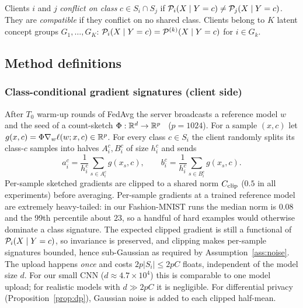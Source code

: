 \begin{definition}\label{def:concept}
Clients $i$ and $j$ \emph{conflict on class} $c\in S_i\cap S_j$ if $\mathcal{P}_i(X\mid Y=c)\neq\mathcal{P}_j(X\mid Y=c)$. They are \emph{compatible} if they conflict on no shared class. Clients belong to $K$ latent concept groups $G_1,\dots,G_K$: $\mathcal{P}_i(X\mid Y=c)=\mathcal{P}^{(k)}(X\mid Y=c)$ for $i\in G_k$.
\end{definition}

\subsection{Method definitions}\label{sec:method}
\subsubsection{Class-conditional gradient signatures (client side)}
After $T_0$ warm-up rounds of FedAvg the server broadcasts a reference model $w$ and the seed of a count-sketch $\Phi:\mathbb{R}^d\to\mathbb{R}^p$~\citep{charikar2002countsketch,weinberger2009hashing} ($p=1024$). For a sample $(x,c)$ let $g(x,c)=\Phi\nabla_w\ell(w;x,c)\in\mathbb{R}^p$. For every class $c\in S_i$ the client randomly splits its class-$c$ samples into halves $A_i^c,B_i^c$ of size $h_i^c$ and sends
\[ a_i^c=\frac1{h_i^c}\sum_{s\in A_i^c}g(x_s,c),\qquad b_i^c=\frac1{h_i^c}\sum_{s\in B_i^c}g(x_s,c). \]
Per-sample sketched gradients are clipped to a shared norm $C_{\rm clip}$ ($0.5$ in all experiments) before averaging. Per-sample gradients at a trained reference model are extremely heavy-tailed: in our Fashion-MNIST runs the median norm is $0.08$ and the 99th percentile about $23$, so a handful of hard examples would otherwise dominate a class signature. The expected clipped gradient is still a functional of $\mathcal{P}_i(X\mid Y=c)$, so invariance is preserved, and clipping makes per-sample signatures bounded, hence sub-Gaussian as required by Assumption~\ref{ass:noise}. The upload happens \emph{once} and costs $2p|S_i|\le 2pC$ floats, independent of the model size $d$. For our small CNN ($d\approx4.7\times10^4$) this is comparable to one model upload; for realistic models with $d\gg 2pC$ it is negligible. For differential privacy (Proposition~\ref{prop:dp}), Gaussian noise is added to each clipped half-mean.

